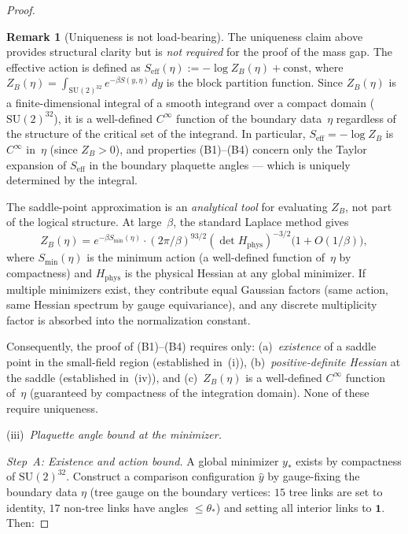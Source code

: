 \documentclass[11pt]{article}
\theoremstyle{definition}
\newtheorem{remark}[theorem]{Remark}
\newcommand{\SU}{\mathrm{SU}}
\begin{document}
\begin{proof}
\begin{remark}[Uniqueness is not load-bearing]
\label{rem:uniqueness-not-needed}
The uniqueness claim above provides structural clarity but is
\emph{not required} for the proof of the mass gap.
The effective action is defined as
$S_{\mathrm{eff}}(\eta):=-\log Z_B(\eta)+\mathrm{const}$,
where $Z_B(\eta)=\int_{\SU(2)^{32}}e^{-\beta S(y,\eta)}\,dy$
is the block partition function.  Since $Z_B(\eta)$ is a
finite-dimensional integral of a smooth integrand over a
compact domain ($\SU(2)^{32}$), it is a well-defined $C^\infty$
function of the boundary data~$\eta$ regardless of the
structure of the critical set of the integrand.
In particular, $S_{\mathrm{eff}}=-\log Z_B$ is $C^\infty$
in~$\eta$ (since $Z_B>0$), and properties (B1)--(B4) concern
only the Taylor expansion of $S_{\mathrm{eff}}$ in the
boundary plaquette angles --- which is uniquely determined
by the integral.

The saddle-point approximation is an \emph{analytical tool}
for evaluating $Z_B$, not part of the logical structure.
At large~$\beta$, the standard Laplace method gives
\begin{equation}
Z_B(\eta)=e^{-\beta S_{\min}(\eta)}
\cdot(2\pi/\beta)^{93/2}
(\det H_{\mathrm{phys}})^{-3/2}
\bigl(1+O(1/\beta)\bigr),
\end{equation}
where $S_{\min}(\eta)$ is the minimum action (a well-defined
function of~$\eta$ by compactness) and $H_{\mathrm{phys}}$
is the physical Hessian at any global minimizer.
If multiple minimizers exist, they contribute equal
Gaussian factors (same action, same Hessian spectrum by
gauge equivariance), and any discrete multiplicity factor
is absorbed into the normalization constant.

Consequently, the proof of (B1)--(B4) requires only:
(a)~\emph{existence} of a saddle point in the small-field
region (established in~(i)),
(b)~\emph{positive-definite Hessian} at the saddle
(established in~(iv)), and
(c)~$Z_B(\eta)$ is a well-defined
$C^\infty$ function of~$\eta$ (guaranteed by compactness
of the integration domain).
None of these require uniqueness.
\end{remark}

(iii)~\emph{Plaquette angle bound at the minimizer.}

\emph{Step~A: Existence and action bound.}
A global minimizer $y_*$ exists by compactness of $\SU(2)^{32}$.
Construct a comparison configuration $\hat{y}$ by gauge-fixing
the boundary data $\eta$ (tree gauge on the boundary vertices:
$15$ tree links are set to identity, $17$ non-tree links
have angles $\le\theta_*$) and setting all interior links to
$\mathbf{1}$.  Then:


\end{proof}
\end{document}
